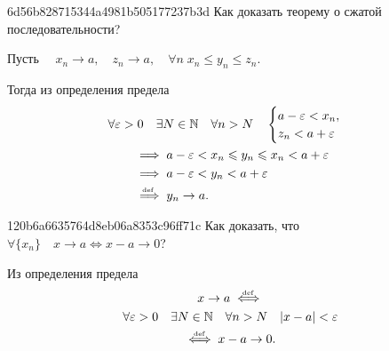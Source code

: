     \begin{note}{6d56b828715344a4981b505177237b3d}
        Как доказать теорему о сжатой последовательности?

        \begin{cloze}{1}
            Пусть \( \quad x_n \to a, \quad z_n \to a, \quad
            \forall n\; x_n \leqslant y_n \leqslant z_n. \)

            Тогда из определения предела \[
                \begin{gathered}
                    \forall \varepsilon > 0 \quad \exists N \in \mathbb N \quad
                    \forall n > N \quad \begin{cases}
                        a - \varepsilon < x_n, \\
                        z_n < a + \varepsilon
                    \end{cases} \\
                    \begin{aligned}
                        &\implies a - \varepsilon < x_n \leqslant y_n \leqslant
                        x_n < a + \varepsilon \\
                        &\implies a - \varepsilon < y_n < a + \varepsilon \\
                        &\overset{\!\!\text{\tiny def}}\implies y_n \to a.
                    \end{aligned}
                \end{gathered}
            \]
        \end{cloze}
    \end{note}

    \begin{note}{120b6a6635764d8eb06a8353c96ff71c}
        Как доказать, что \( \forall \{ x_n \} \quad x \to a \iff x - a \to 0 \)?

        \begin{cloze}{1}
            Из определения предела \begin{multline*}
                x \to a \overset{\hspace{-1pt}\text{\tiny def}}\iff  \\
                \forall \varepsilon > 0 \quad \exists N \in \mathbb N \quad
                \forall n > N \quad |x - a| < \varepsilon \\
                \overset{\hspace{-1pt}\text{\tiny def}}\iff x - a \to 0.
            \end{multline*}
        \end{cloze}
    \end{note}

